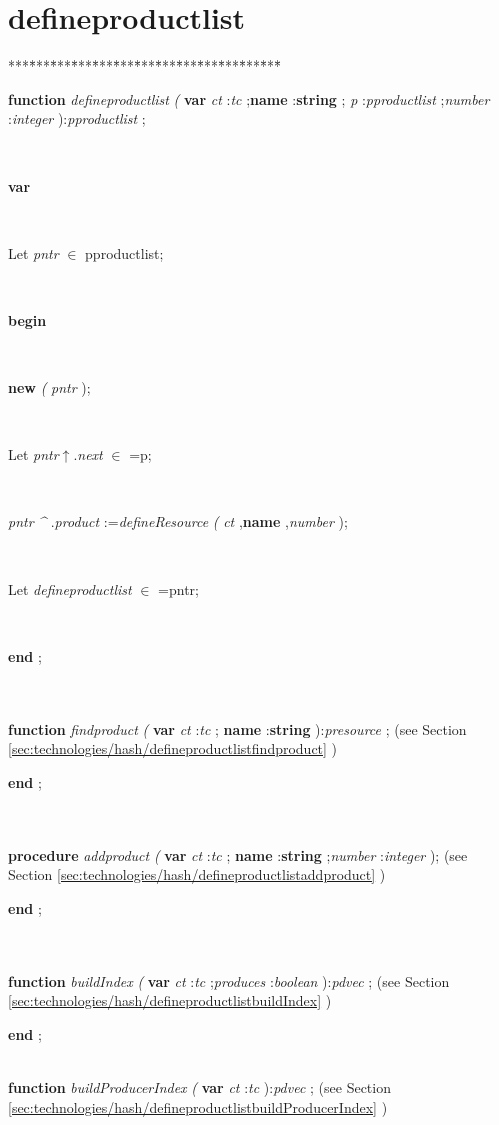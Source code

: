 \section{defineproductlist}\label{sec:technologies/hashdefineproductlist}

\begin{tabbing}
***\=***\=***\=***\=***\=***\=***\=***\=***\=***\=***\=***\=***\=\kill
\parbox{14cm}{\textsf{\textbf{function}   \textit{defineproductlist} \textit{(} \textbf{var}  \textit{ct} :\textit{tc} ;\textbf{name} :\textbf{string} ; \textit{p} :\textit{pproductlist} ;\textit{number} :\textit{integer} ):\textit{pproductlist} ;}}\\
\+\parbox{14cm}{\textsf{\textbf{var} }}\\
\parbox{14cm}{\textsf{Let \textit{pntr} $\in$ pproductlist;}}\\
\-\<\+\parbox{14cm}{\textsf{\textbf{begin} }}\\
\parbox{14cm}{\textsf{\textbf{new} \textit{(} \textit{pntr} );}}\\
\parbox{14cm}{\textsf{Let \textit{pntr}$\uparrow$.\textit{next} $\in$ =p;}}\\
\parbox{14cm}{\textsf{\textit{pntr} \textit{\^{}} .\textit{product} :=\textit{defineResource} \textit{(} \textit{ct} ,\textbf{name} ,\textit{number} );}}\\
\parbox{14cm}{\textsf{Let \textit{defineproductlist} $\in$ =pntr;}}\\
\<\-\parbox{14cm}{\textsf{\textbf{end} ;}}\\
\\
\+\textsf{\textbf{function}   \textit{findproduct} \textit{(} \textbf{var}  \textit{ct} :\textit{tc} ;  \textbf{name} :\textbf{string} ):\textit{presource} ;} (see Section \ref{sec:technologies/hash/defineproductlistfindproduct} )\\
\<\-\parbox{14cm}{\textsf{\textbf{end} ;}}\\
\\
\textsf{\textbf{procedure}   \textit{addproduct} \textit{(}  \textbf{var}  \textit{ct} :\textit{tc} ; \textbf{name} :\textbf{string} ;\textit{number} :\textit{integer} );} (see Section \ref{sec:technologies/hash/defineproductlistaddproduct} )\\
\parbox{14cm}{\textsf{\textbf{end} ;}}\\
\\
\textsf{\textbf{function}   \textit{buildIndex} \textit{(} \textbf{var}  \textit{ct} :\textit{tc} ;\textit{produces} :\textit{boolean} ):\textit{pdvec}  ;} (see Section \ref{sec:technologies/hash/defineproductlistbuildIndex} )\\
\parbox{14cm}{\textsf{\textbf{end} ;}}\\
\textsf{\textbf{function}   \textit{buildProducerIndex} \textit{(} \textbf{var}  \textit{ct} :\textit{tc} ):\textit{pdvec}  ;} (see Section \ref{sec:technologies/hash/defineproductlistbuildProducerIndex} )\\
\end{tabbing}
